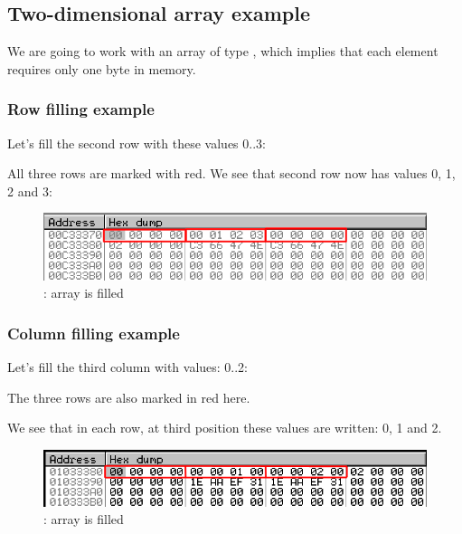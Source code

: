 \subsection{Two-dimensional array example}

We are going to work with an array of type \Tchar, which implies that each element requires only one 
byte in memory.

\subsubsection{Row filling example}
\myindex{\olly}

Let's fill the second row with these values 0..3:



All three rows are marked with red. 
We see that second row now has values 0, 1, 2 and 3:

\begin{figure}[H]
\centering
\includegraphics[scale=\NormalScale]{patterns/13_arrays/5_multidimensional/olly_2D_1.png}
\caption{\olly: array is filled}
\end{figure}

\subsubsection{Column filling example}
\myindex{\olly}

Let's fill the third column with values: 0..2:



The three rows are also marked in red here. 

We see that in each row, at third position these values are written: 0, 1 and 2.

\begin{figure}[H]
\centering
\includegraphics[scale=\NormalScale]{patterns/13_arrays/5_multidimensional/olly_2D_2.png}
\caption{\olly: array is filled}
\end{figure}

